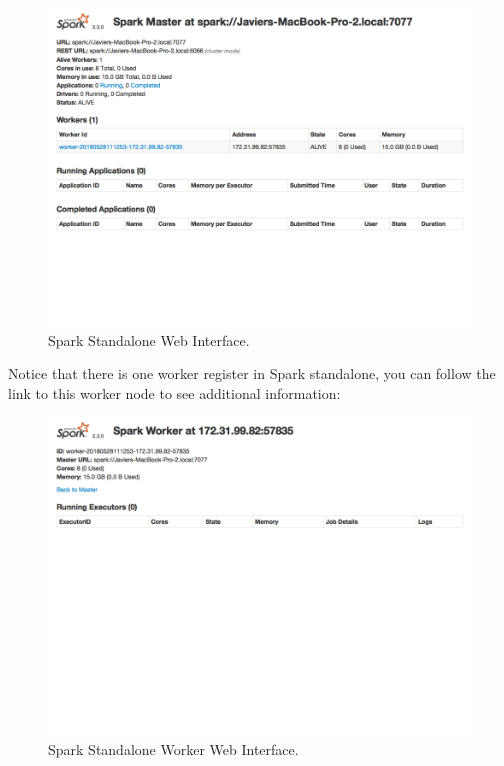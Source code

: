 \documentclass[]{book}
\theoremstyle{definition}
\theoremstyle{definition}
\theoremstyle{definition}
\theoremstyle{remark}
\begin{document}
\begin{figure}

{\centering \includegraphics[width=13.78in]{images/05-clusters-spark-standalone-web-ui} 

}

\caption{Spark Standalone Web Interface.}\label{fig:spark-standalone-web-ui}
\end{figure}

Notice that there is one worker register in Spark standalone, you can
follow the link to this worker node to see additional information:

\begin{figure}

{\centering \includegraphics[width=13.78in]{images/05-clusters-spark-standalone-web-ui-worker} 

}

\caption{Spark Standalone Worker Web Interface.}\label{fig:spark-standalone-web-ui-worker}
\end{figure}
\end{document}
